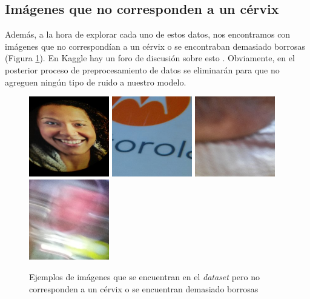\subsection{Imágenes que no corresponden a un cérvix}

Además, a la hora de explorar cada uno de estos datos, nos encontramos con imágenes que no correspondían a un cérvix o se encontraban demasiado borrosas (Figura \ref{fig:no-cervix-image}). En Kaggle hay un foro de discusión sobre esto \cite{ImagesExcluded}. Obviamente, en el posterior proceso de preprocesamiento de datos se eliminarán para que no agreguen ningún tipo de ruido a nuestro modelo.

\begin{figure}[H]
	\centering
	\includegraphics[width=3.5cm]{img/3086}
	\includegraphics[width=3.5cm]{img/4065}
	\includegraphics[width=3.5cm]{img/4533}
	\includegraphics[width=3.5cm]{img/4367}
	\caption{Ejemplos de imágenes que se encuentran en el \textit{dataset} pero no corresponden a un cérvix o se encuentran demasiado borrosas}
	\label{fig:no-cervix-image}
\end{figure}


